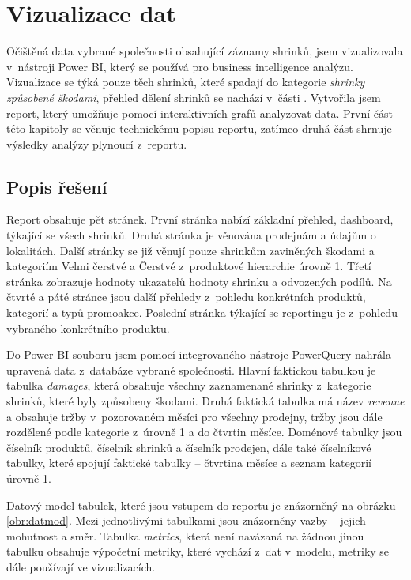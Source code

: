 \chapter{Vizualizace dat}
\label{ch:vizualizace}

Očištěná data vybrané společnosti obsahující záznamy shrinků, jsem vizualizovala v~nástroji Power BI, který se používá pro business intelligence analýzu. Vizualizace se týká pouze těch shrinků, které spadají do kategorie \emph{shrinky způsobené škodami}, přehled dělení shrinků se nachází v~části \label{sec:shrinkyTypy}
. Vytvořila jsem report, který umožňuje pomocí interaktivních grafů analyzovat data. První část této kapitoly se věnuje technickému popisu reportu, zatímco druhá část shrnuje výsledky analýzy plynoucí z~reportu.

\section{Popis řešení}
\label{sec:vizualizace:popis}

Report obsahuje pět stránek. První stránka nabízí základní přehled, dashboard, týkající se všech shrinků. Druhá stránka je věnována prodejnám a údajům o lokalitách.
Další stránky se již věnují pouze shrinkům zaviněných škodami a kategoriím Velmi čerstvé a Čerstvé z~produktové hierarchie úrovně 1. Třetí stránka zobrazuje hodnoty ukazatelů hodnoty shrinku a odvozených podílů. Na čtvrté a páté stránce jsou další přehledy z~pohledu konkrétních produktů, kategorií a typů promoakce. Poslední stránka týkající se reportingu je z~pohledu vybraného konkrétního produktu.

Do Power BI souboru jsem pomocí integrovaného nástroje PowerQuery nahrála upravená data z~databáze vybrané společnosti. Hlavní faktickou tabulkou je tabulka \emph{damages}, která obsahuje všechny zaznamenané shrinky z~kategorie shrinků, které byly způsobeny škodami. Druhá faktická tabulka má název \emph{revenue} a obsahuje tržby v~pozorovaném měsíci pro všechny prodejny, tržby jsou dále rozdělené podle kategorie z~úrovně 1 a do čtvrtin měsíce. Doménové tabulky jsou číselník produktů, číselník shrinků a číselník prodejen, dále také číselníkové tabulky, které spojují faktické tabulky -- čtvrtina měsíce a seznam kategorií úrovně 1. 

Datový model tabulek, které jsou vstupem do reportu je znázorněný na obrázku \ref{obr:datmod}. Mezi jednotlivými tabulkami jsou znázorněny vazby -- jejich mohutnost a směr. Tabulka \emph{metrics}, která není navázaná na žádnou jinou tabulku obsahuje výpočetní metriky, které vychází z~dat v~modelu, metriky se dále používají ve vizualizacích.

